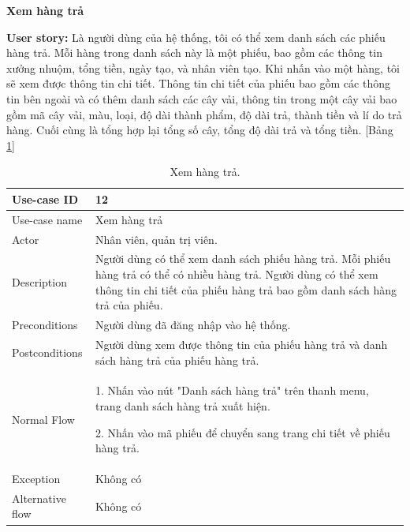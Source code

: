 \textbf{Xem hàng trả}\par
\textbf{User story:} Là người dùng của hệ thống, tôi có thể xem danh sách các phiếu hàng trả. Mỗi hàng trong danh sách này là một phiếu, bao gồm các thông tin xưởng nhuộm, tổng tiền, ngày tạo, và nhân viên tạo. Khi nhấn vào một hàng, tôi sẽ xem được thông tin chi tiết. Thông tin chi tiết của phiếu bao gồm các thông tin bên ngoài và có thêm danh sách các cây vải, thông tin trong một cây vải bao gồm mã cây vải, màu, loại, độ dài thành phẩm, độ dài trả, thành tiền và lí do trả hàng. Cuối cùng là tổng hợp lại tổng số cây, tổng độ dài trả và tổng tiền. [Bảng \ref{bang12}]
\begin{table}[H]
    \centering
    \begin{tabular}{|m{3cm}|m{10cm}|}
    \hline 
        Use-case ID & 12\\ \hline
        Use-case name & Xem hàng trả\\ \hline
        Actor & Nhân viên, quản trị viên.\\ \hline
        Description & Người dùng có thể xem danh sách phiếu hàng trả. Mỗi phiếu hàng trả có thể có nhiều hàng trả. Người dùng có thể xem thông tin chi tiết của phiếu hàng trả bao gồm danh sách hàng trả của phiếu.\\ \hline
        Preconditions & Người dùng đã đăng nhập vào hệ thống.\\ \hline
        Postconditions & Người dùng xem được thông tin của phiếu hàng trả và danh sách hàng trả của phiếu hàng trả.\\ \hline
        Normal Flow & 
        1. Nhấn vào nút "Danh sách hàng trả" trên thanh menu, trang danh sách hàng trả xuất hiện.\par
        2. Nhấn vào mã phiếu để chuyển sang trang chi tiết về phiếu hàng trả.
        \\ \hline
        Exception & Không có\\ \hline
        Alternative flow & Không có\\ 
    \hline 
    \end{tabular}
    \caption{Xem hàng trả.}
    \label{bang12}
\end{table}


